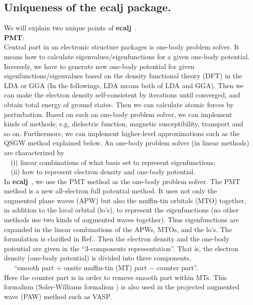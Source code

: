 \documentclass[a4paper,10pt,epsf,fleqn]{article}
\newcommand{\ecalj}{{\bf ecalj}\ }
\begin{document}
\subsection{Uniqueness of the ecalj package.}
\label{sec:fecalj}
We will explain two unique points of \ecalj.\\
{\bf PMT}:\\
Central part in an electronic structure packages is one-body problem solver.
It means how to calculate eigenvalues/eigenfunctions for a
given one-body potential. Inversely, we have to generate new one-body potential 
for given eigenfunctions/eigenvalues
based on the density functional theory (DFT) in the LDA or GGA
(In the followings, LDA means both of LDA and GGA).
Then we can make the electron density self-consistent by iterations
until converged, and obtain total energy of ground states.
Then we can calculate atomic forces by perturbation.
Based on such an one-body problem solver, 
we can implement kinds of methods; e.g, dielectric function, magnetic
susceptibility, transport and so on.
Furthermore, we can implement higher-level approximations 
such as the QSGW method explained below.
An one-body problem solver (in linear methods) are
characterized by \\
\ \ (i) linear combinations of what basis set to represent eigenfunctions; \\
\ \ (ii) how to represent electron density and one-body potential. \\
In \ecalj, we use the PMT method \cite{kotani2015pmt,Kotani2010} as the one-body problem solver.
The PMT method is a new all-electron full potential method. It uses not only the
augmented plane waves (APW) but also the muffin-tin orbitals (MTO) together,
in addition to the local orbital (lo's), to represent the eigenfunctions
(no other methods use two kinds of augmented waves together).
Thus eigenfunctions are expanded in the linear combinations of the
APWs, MTOs, and the lo's.
The formulation is clarified in Ref.\cite{kotani2015pmt}.
Then the electron density and the one-body potential are given
in the ``3-components representation''. 
That is, the electron density 
(one-body potential) is divided into three components, \\
\ \ \ ``smooth part $+$ onsite muffin-tin (MT) part $-$ counter part''. \\
Here the counter part is in order to remove smooth part within MTs.
This formalism (Soler-Williams formalism 
\cite{soler89,soler90}) is also used in 
the projected augmented wave (PAW) method such as VASP.
\end{document}
